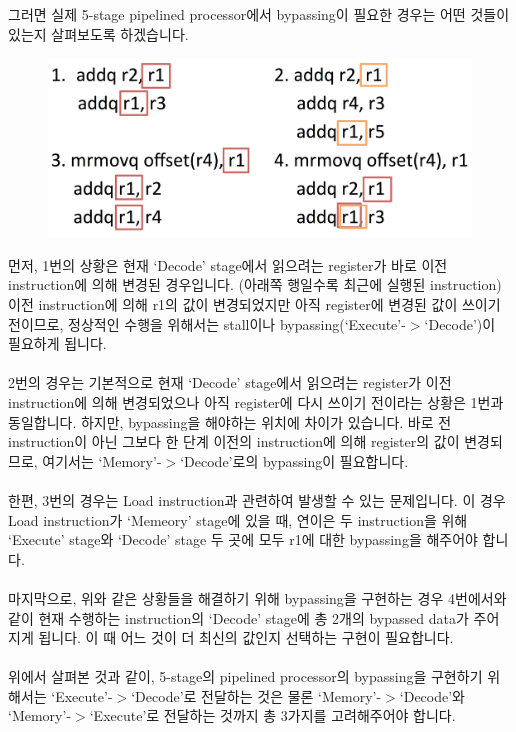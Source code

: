 \documentclass{article}
\begin{document}
그러면 실제 5-stage pipelined processor에서 bypassing이 필요한 경우는 어떤 것들이 있는지 
살펴보도록 하겠습니다. 
\\
\begin{figure}[htbp]
	\begin{center}
		\includegraphics[scale=0.1]{ex.png}
		\label{fig:2pipe_proc}
	\end{center}
\end{figure}

\noindent 먼저, 1번의 상황은 현재 `Decode' stage에서 읽으려는 register가 바로
이전 instruction에 의해 변경된 경우입니다. (아래쪽 행일수록  최근에 실행된
instruction)
이전 instruction에 의해 r1의 값이 변경되었지만 아직 register에 변경된 값이 쓰이기 전이므로, 정상적인 수행을 위해서는 stall이나 
bypassing(`Execute'-$>$`Decode')이 필요하게 됩니다.\\
\\2번의 경우는 기본적으로 현재 `Decode' stage에서 읽으려는 register가 이전 instruction에 의해 변경되었으나 아직 register에
다시 쓰이기 전이라는 상황은 1번과 동일합니다. 하지만, bypassing을 해야하는 위치에 차이가 있습니다. 바로 전 instruction이 아닌 그보다 한 단계
이전의 instruction에 의해 register의 값이 변경되므로, 여기서는
`Memory'-$>$`Decode'로의 bypassing이 필요합니다.\\
\\한편, 3번의 경우는 Load instruction과 관련하여 발생할 수 있는 문제입니다. 이
경우 Load instruction가 `Memeory' stage에 있을 때, 
연이은 두 instruction을 위해 `Execute' stage와 `Decode' stage 두 곳에 모두 r1에 대한 bypassing을 해주어야 합니다.\\
\\마지막으로, 위와 같은 상황들을 해결하기 위해 bypassing을 구현하는 경우
4번에서와 같이 현재 수행하는 instruction의 `Decode'
stage에 총 2개의 bypassed data가 주어지게 됩니다. 이 때 어느 것이 더 최신의 값인지 선택하는 구현이 필요합니다.\\
\\
위에서 살펴본 것과 같이, 5-stage의 pipelined processor의 bypassing을 구현하기
위해서는 `Execute'-$>$`Decode'로 전달하는 것은 물론
`Memory'-$>$`Decode'와 `Memory'-$>$`Execute'로 전달하는 것까지 총 3가지를 고려해주어야 합니다.
\end{document}
